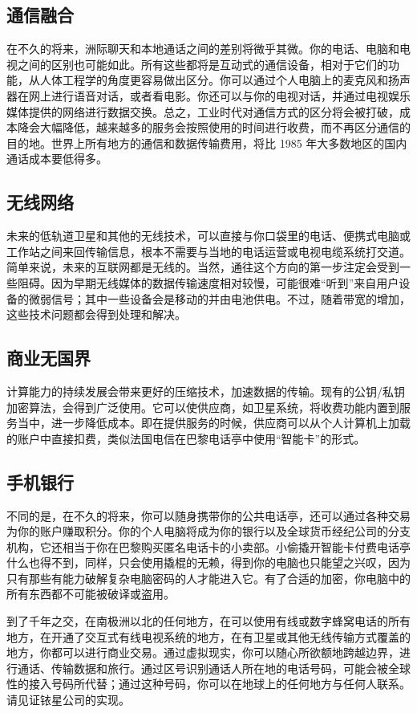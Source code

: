 \subsection{通信融合}
在不久的将来，洲际聊天和本地通话之间的差别将微乎其微。你的电话、电脑和电视之间的区别也可能如此。所有这些都将是互动式的通信设备，相对于它们的功能，从人体工程学的角度更容易做出区分。你可以通过个人电脑上的麦克风和扬声器在网上进行语音对话，或者看电影。你还可以与你的电视对话，并通过电视娱乐媒体提供的网络进行数据交换。总之，工业时代对通信方式的区分将会被打破，成本降会大幅降低，越来越多的服务会按照使用的时间进行收费，而不再区分通信的目的地。世界上所有地方的通信和数据传输费用，将比 1985 年大多数地区的国内通话成本要低得多。

\subsection{无线网络}
未来的低轨道卫星和其他的无线技术，可以直接与你口袋里的电话、便携式电脑或工作站之间来回传输信息，根本不需要与当地的电话运营或电视电缆系统打交道。简单来说，未来的互联网都是无线的。当然，通往这个方向的第一步注定会受到一些阻碍。因为早期无线媒体的数据传输速度相对较慢，可能很难“听到”来自用户设备的微弱信号；其中一些设备会是移动的并由电池供电。不过，随着带宽的增加，这些技术问题都会得到处理和解决。

\subsection{商业无国界}
计算能力的持续发展会带来更好的压缩技术，加速数据的传输。现有的公钥/私钥加密算法，会得到广泛使用。它可以使供应商，如卫星系统，将收费功能内置到服务当中，进一步降低成本。即在提供服务的时候，供应商可以从个人计算机上加载的账户中直接扣费，类似法国电信在巴黎电话亭中使用“智能卡”的形式。

\subsection{手机银行}
不同的是，在不久的将来，你可以随身携带你的公共电话亭，还可以通过各种交易为你的账户赚取积分。你的个人电脑将成为你的银行以及全球货币经纪公司的分支机构，它还相当于你在巴黎购买匿名电话卡的小卖部。小偷撬开智能卡付费电话亭什么也得不到，同样，只会使用撬棍的无赖，得到你的电脑也只能望之兴叹，因为只有那些有能力破解复杂电脑密码的人才能进入它。有了合适的加密，你电脑中的所有东西都不可能被破译或盗用。

到了千年之交，在南极洲以北的任何地方，在可以使用有线或数字蜂窝电话的所有地方，在开通了交互式有线电视系统的地方，在有卫星或其他无线传输方式覆盖的地方，你都可以进行商业交易。通过虚拟现实，你可以随心所欲额地跨越边界，进行通话、传输数据和旅行。通过区号识别通话人所在地的电话号码，可能会被全球性的接入号码所代替；通过这种号码，你可以在地球上的任何地方与任何人联系。请见证铱星公司的实现。

